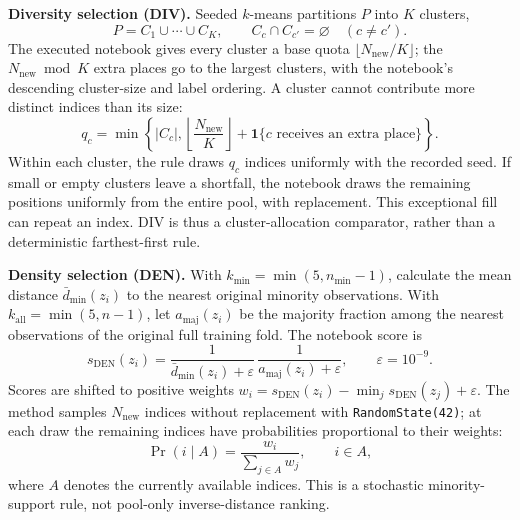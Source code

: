 \documentclass[pdflatex]{sn-jnl}
\begin{document}
\textbf{Diversity selection (DIV).} Seeded \(k\)-means partitions \(P\) into \(K\) clusters,
\begin{equation}\label{eq:5}
P=C_1\cup\cdots\cup C_K,\qquad C_c\cap C_{c'}=\varnothing
\quad(c\ne c').
\end{equation}
The executed notebook gives every cluster a base quota \(\lfloor N_{\mathrm{new}}/K\rfloor\); the \(N_{\mathrm{new}}\bmod K\) extra places go to the largest clusters, with the notebook's descending cluster-size and label ordering. A cluster cannot contribute more distinct indices than its size:
\begin{equation}\label{eq:6}
q_c=\min\left\{|C_c|,\left\lfloor\frac{N_{\mathrm{new}}}{K}\right\rfloor+
\mathbf{1}\{c\text{ receives an extra place}\}\right\}.
\end{equation}
Within each cluster, the rule draws \(q_c\) indices uniformly with the recorded seed. If small or empty clusters leave a shortfall, the notebook draws the remaining positions uniformly from the entire pool, with replacement. This exceptional fill can repeat an index. DIV is thus a cluster-allocation comparator, rather than a deterministic farthest-first rule.

\textbf{Density selection (DEN).} With \(k_{\min}=\min(5,n_{\min}-1)\), calculate the mean distance \(\bar d_{\min}(z_i)\) to the nearest original minority observations. With \(k_{\mathrm{all}}=\min(5,n-1)\), let \(a_{\mathrm{maj}}(z_i)\) be the majority fraction among the nearest observations of the original full training fold. The notebook score is
\begin{equation}\label{eq:7}
s_{\mathrm{DEN}}(z_i)=
\frac{1}{\bar d_{\min}(z_i)+\varepsilon}\,
\frac{1}{a_{\mathrm{maj}}(z_i)+\varepsilon},
\qquad \varepsilon=10^{-9}.
\end{equation}
Scores are shifted to positive weights \(w_i=s_{\mathrm{DEN}}(z_i)-\min_j s_{\mathrm{DEN}}(z_j)+\varepsilon\). The method samples \(N_{\mathrm{new}}\) indices without replacement with \texttt{RandomState(42)}; at each draw the remaining indices have probabilities proportional to their weights:
\begin{equation}\label{eq:8}
\Pr(i\mid A)=\frac{w_i}{\sum_{j\in A}w_j},
\qquad i\in A,
\end{equation}
where \(A\) denotes the currently available indices. This is a stochastic minority-support rule, not pool-only inverse-distance ranking.
\end{document}
